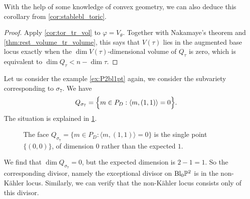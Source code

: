 With the help of some knowledge of convex geometry, we can also deduce this corollary from \cref{cor:stablebl_toric}.

\begin{proof}
Apply \cref{cor:tor_tr_vol} to $\varphi=V_{\theta}$. Together with Nakamaye's theorem \cite[Theorem~5.7]{ELMNP09} and \cref{thm:rest_volume_tr_volume}, this says that $V(\tau)$ lies in the augmented base locus exactly when the $\dim V(\tau)$-dimensional volume of $Q_{\tau}$ is zero, which is equivalent to $\dim Q_{\tau}<n-\dim\tau$.
\end{proof}


\begin{example}\label{ex:P2bl_nK}
    Let us consider the example \cref{ex:P2bl1pt} again, we consider the subvariety corresponding to $\sigma_7$. We have
    \[
    Q_{\sigma_7}=\Bigl\{m\in P_D: \langle m,(1,1) \rangle=0 \Bigr\}.
    \]
    The situation is explained in \cref{fig:Qsigma7}.
    \begin{figure}[ht]
        \centering
        \caption{The face $Q_{\sigma_7}=\{m\in P_D:\langle m,(1,1)\rangle=0\}$ is the single point $\{(0,0)\}$, of dimension $0$ rather than the expected $1$.}
        \label{fig:Qsigma7}
    \end{figure}
    We find that $\dim Q_{\sigma_7}=0$, but the expected dimension is $2-1=1$. So the corresponding divisor, namely the exceptional divisor on $\mathrm{Bl}_0\mathbb{P}^2$ is in the non-Kähler locus. Similarly, we can verify that the non-Kähler locus consists only of this divisor.
\end{example}




